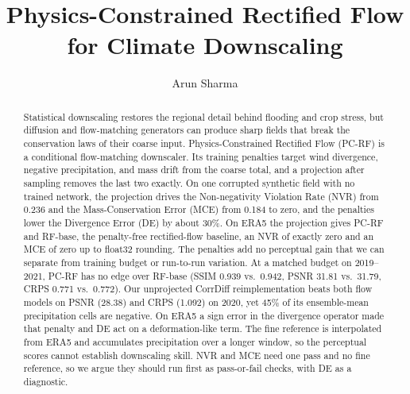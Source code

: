 \documentclass[sigconf,nonacm]{acmart}
\newcommand{\pcrf}{\textsc{PC-RF}\xspace}
\begin{document}
\title{Physics-Constrained Rectified Flow for Climate Downscaling}

\author{Arun Sharma}

\begin{abstract}
Statistical downscaling restores the regional detail behind flooding and crop stress, but diffusion and flow-matching generators can produce sharp fields that break the conservation laws of their coarse input. Physics-Constrained Rectified Flow (\pcrf) is a conditional flow-matching downscaler. Its training penalties target wind divergence, negative precipitation, and mass drift from the coarse total, and a projection after sampling removes the last two exactly. On one corrupted synthetic field with no trained network, the projection drives the Non-negativity Violation Rate (NVR) from 0.236 and the Mass-Conservation Error (MCE) from 0.184 to zero, and the penalties lower the Divergence Error (DE) by about 30\%. On ERA5 the projection gives \pcrf and RF-base, the penalty-free rectified-flow baseline, an NVR of exactly zero and an MCE of zero up to float32 rounding. The penalties add no perceptual gain that we can separate from training budget or run-to-run variation. At a matched budget on 2019--2021, \pcrf has no edge over RF-base (SSIM 0.939 vs.\ 0.942, PSNR 31.81 vs.\ 31.79, CRPS 0.771 vs.\ 0.772). Our unprojected CorrDiff reimplementation beats both flow models on PSNR (28.38) and CRPS (1.092) on 2020, yet 45\% of its ensemble-mean precipitation cells are negative. On ERA5 a sign error in the divergence operator made that penalty and DE act on a deformation-like term. The fine reference is interpolated from ERA5 and accumulates precipitation over a longer window, so the perceptual scores cannot establish downscaling skill. NVR and MCE need one pass and no fine reference, so we argue they should run first as pass-or-fail checks, with DE as a diagnostic.
\end{abstract}
\end{document}
